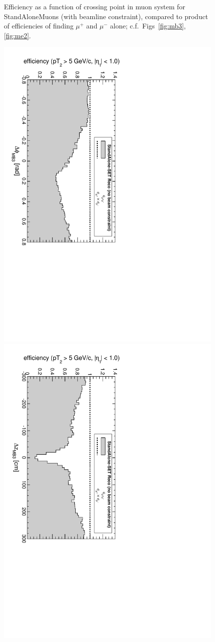 \documentclass[12pt]{article}
\begin{document}
\begin{figure}[p]
\caption{Efficiency as a function of crossing point in muon system for
  StandAloneMuons (with beamline constraint), compared to product of
  efficiencies of finding $\mu^+$ and $\mu^-$ alone;
  c.f.\ Figs~\ref{fig:mb3}, \ref{fig:me2}.}
\end{figure}

\begin{figure}[p]
\includegraphics[height=0.5\linewidth, angle=90]{fig/acceptance7_plot/vsmb3dphi_StandAloneSET.pdf}
\includegraphics[height=0.5\linewidth, angle=90]{fig/acceptance7_plot/vsmb3dz_StandAloneSET.pdf}


\end{figure}
\end{document}
